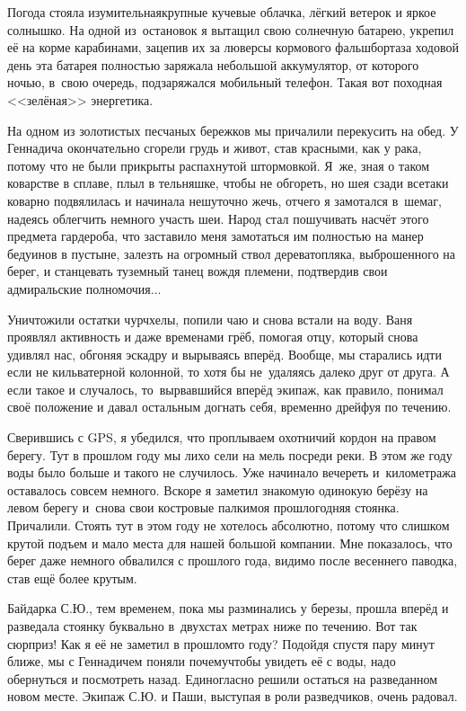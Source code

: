 Погода стояла изумительная\mdash крупные кучевые облачка, лёгкий ветерок и яркое солнышко. На одной из~остановок я вытащил свою солнечную батарею, укрепил её на корме карабинами, зацепив их за люверсы кормового фальшборта\mdash за ходовой день эта батарея полностью заряжала небольшой аккумулятор, от которого ночью, в~свою очередь, подзаряжался мобильный телефон. Такая вот походная <<зелёная>> энергетика.

На одном из золотистых песчаных бережков мы причалили перекусить на обед. У Геннадича окончательно сгорели грудь и живот, став красными, как у рака, потому что не были прикрыты распахнутой штормовкой. Я~же, зная о таком коварстве в сплаве, плыл в тельняшке, чтобы не обгореть, но шея сзади все\sdash таки коварно подвялилась и начинала нешуточно жечь, отчего я замотался в~шемаг, надеясь облегчить немного участь шеи. Народ стал пошучивать насчёт этого предмета гардероба, что заставило меня замотаться им полностью на манер бедуинов в пустыне, залезть на огромный ствол дерева\sdash топляка, выброшенного на берег, и станцевать туземный танец вождя племени, подтвердив свои адмиральские полномочия$\ldots$

Уничтожили остатки чурчхелы, попили чаю и снова встали на воду. Ваня проявлял активность и даже временами грёб, помогая отцу, который снова удивлял нас, обгоняя эскадру и вырываясь вперёд. Вообще, мы старались идти если не кильватерной колонной, то хотя бы не~удаляясь далеко друг от друга. А если такое и случалось, то~вырвавшийся вперёд экипаж, как правило, понимал своё положение и давал остальным догнать себя, временно дрейфуя по течению.

Сверившись с GPS, я убедился, что проплываем охотничий кордон на правом берегу. Тут в прошлом году мы лихо сели на мель посреди реки. В этом же году воды было больше и такого не случилось. Уже начинало вечереть и~километража оставалось совсем немного. Вскоре я заметил знакомую одинокую берёзу на левом берегу и~снова свои костровые палки\mdash моя прошлогодняя стоянка. Причалили. Стоять тут в этом году не хотелось абсолютно, потому что слишком крутой подъем и мало места для нашей большой компании. Мне показалось, что берег даже немного обвалился с прошлого года, видимо после весеннего паводка, став ещё более крутым.

Байдарка С.Ю., тем временем, пока мы разминались у березы, прошла вперёд и разведала стоянку буквально в~двухстах метрах ниже по течению. Вот так сюрприз! Как я её не заметил в прошлом\sdash то году? Подойдя спустя пару минут ближе, мы с Геннадичем поняли почему\mdash чтобы увидеть её с воды, надо обернуться и посмотреть назад. Единогласно решили остаться на разведанном новом месте. Экипаж С.Ю. и Паши, выступая в роли разведчиков, очень радовал. 

